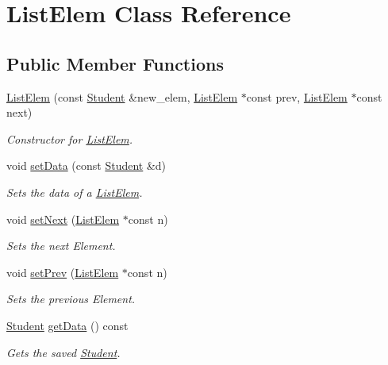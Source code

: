 \hypertarget{class_list_elem}{}\section{List\+Elem Class Reference}
\label{class_list_elem}
\subsection*{Public Member Functions}
\begin{DoxyCompactItemize}
\item 
\hyperlink{class_list_elem_af7611fadd253200b0eb35a74c2f2f412}{List\+Elem} (const \hyperlink{class_student}{Student} \&new\+\_\+elem, \hyperlink{class_list_elem}{List\+Elem} $\ast$const prev, \hyperlink{class_list_elem}{List\+Elem} $\ast$const next)
\begin{DoxyCompactList}\small\item\em Constructor for \hyperlink{class_list_elem}{List\+Elem}. \end{DoxyCompactList}\item 
void \hyperlink{class_list_elem_af28aa52ed74728f9ee6f0cc52794b3e8}{set\+Data} (const \hyperlink{class_student}{Student} \&d)
\begin{DoxyCompactList}\small\item\em Sets the data of a \hyperlink{class_list_elem}{List\+Elem}. \end{DoxyCompactList}\item 
void \hyperlink{class_list_elem_aca66e560d24ac2954f738f52de2e15b3}{set\+Next} (\hyperlink{class_list_elem}{List\+Elem} $\ast$const n)
\begin{DoxyCompactList}\small\item\em Sets the next Element. \end{DoxyCompactList}\item 
void \hyperlink{class_list_elem_aae056f9271098897ce8bf243354cd744}{set\+Prev} (\hyperlink{class_list_elem}{List\+Elem} $\ast$const n)
\begin{DoxyCompactList}\small\item\em Sets the previous Element. \end{DoxyCompactList}\item 
\hyperlink{class_student}{Student} \hyperlink{class_list_elem_af80ce8c80d9e4dfa450d9272c965e110}{get\+Data} () const
\begin{DoxyCompactList}\small\item\em Gets the saved \hyperlink{class_student}{Student}. \end{DoxyCompactList}\item 

\end{DoxyCompactItemize}
